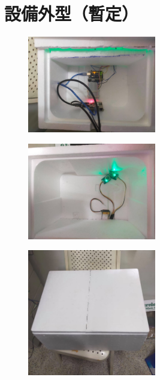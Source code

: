 \section{設備外型（暫定）}
\begin{figure}[H]
	\centering
	\includegraphics[width=0.5\textwidth]{pic/box(1).jpg}
\end{figure}
\begin{figure}[H]
	\centering
	\includegraphics[width=0.5\textwidth]{pic/box(2).jpg}
\end{figure}
\begin{figure}[H]
	\centering
	\includegraphics[width=0.5\textwidth]{pic/box(3).jpg}
\end{figure}